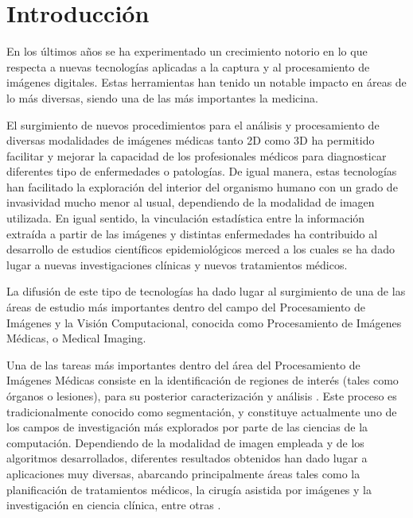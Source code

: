 \chapter{Introducción}
En los últimos años se ha experimentado un crecimiento notorio en lo que respecta a nuevas tecnologías aplicadas a la captura y al procesamiento de imágenes digitales. Estas herramientas han tenido un notable impacto en áreas de lo más diversas, siendo una de las más importantes la medicina. 

El surgimiento de nuevos procedimientos para el análisis y procesamiento de diversas modalidades de imágenes médicas tanto 2D como 3D ha permitido facilitar y mejorar la capacidad de los profesionales médicos para diagnosticar diferentes tipo de enfermedades o patologías. De igual manera, estas tecnologías han facilitado la exploración del interior del organismo humano con un grado de invasividad mucho menor al usual, dependiendo de la modalidad de imagen utilizada. En igual sentido, la vinculación estadística entre la información extraída a partir de las imágenes y distintas enfermedades ha contribuido al desarrollo de estudios científicos epidemiológicos merced a los cuales se ha dado lugar a nuevas investigaciones clínicas y nuevos tratamientos médicos.

La difusión de este tipo de tecnologías ha dado lugar al surgimiento de una de las áreas de estudio más importantes dentro del campo del Procesamiento de Imágenes y la Visión Computacional, conocida como Procesamiento de Imágenes Médicas, o Medical Imaging.

Una de las tareas más importantes dentro del área del Procesamiento de Imágenes
Médicas consiste en la identificación de regiones de interés (tales como órganos o lesiones), para su posterior caracterización y análisis \citep{pham2000current}. Este proceso es tradicionalmente conocido como segmentación, y constituye actualmente uno de los campos de investigación más explorados por parte de las ciencias de la computación. Dependiendo de la modalidad de imagen empleada y de los algoritmos desarrollados, diferentes resultados obtenidos han dado lugar a aplicaciones muy diversas, abarcando principalmente áreas tales
como la planificación de tratamientos médicos, la cirugía asistida por imágenes y la investigación en ciencia clínica, entre otras \citep{bankman2008handbook}.

